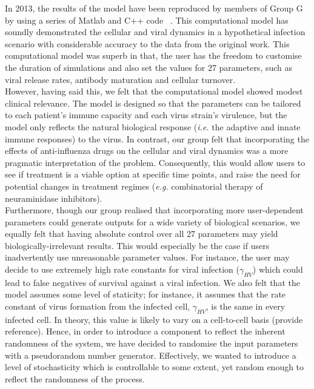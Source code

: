 \documentclass[a4paper, 12pt]{report}
\begin{document}
In 2013, the results of the model have been reproduced by members of Group G by using a series of Matlab and C++ code ~\cite{GroupG}. This computational model has soundly demonstrated the cellular and viral dynamics in a hypothetical infection scenario with considerable accuracy to the data from the original work. This computational model was superb in that, the user has the freedom to customise the duration of simulations and also set the values for 27 parameters, such as viral release rates, antibody maturation and cellular turnover. \\


However, having said this, we felt that the computational model showed modest clinical relevance. The model is designed so that the parameters can be tailored to each patient's immune capacity and each virus strain's virulence, but the model only reflects the natural biological response (\emph{i.e.} the adaptive and innate immune responses) to the virus. In contrast, our group felt that incorporating the effects of anti-influenza drugs on the cellular and viral dynamics was a more pragmatic interpretation of the problem. Consequently, this would allow users to see if treatment is a viable option at specific time points, and raise the need for potential changes in treatment regimes (\emph{e.g.} combinatorial therapy of neuraminidase inhibitors). \\

Furthermore, though our group realised that incorporating more user-dependent parameters could generate outputs for a wide variety of biological scenarios, we equally felt that having absolute control over all 27 parameters may yield biologically-irrelevant results. This would especially be the case if users inadvertently use unreasonable parameter values. For instance, the user may decide to use extremely high rate constants for viral infection ($\gamma_{HV}$) which could lead to false negatives of survival against a viral infection. We also felt that the model assumes some level of staticity; for instance, it assumes that the rate constant of virus formation from the infected cell, $\gamma_{HV}$, is the same in every infected cell. In theory, this value is likely to vary on a cell-to-cell basis (provide reference). Hence, in order to introduce a component to reflect the inherent randomness of the system, we have decided to randomise the input parameters with a pseudorandom number generator. Effectively, we wanted to introduce a level of stochasticity which is controllable to some extent, yet random enough to reflect the randomness of the process. \\
\end{document}
